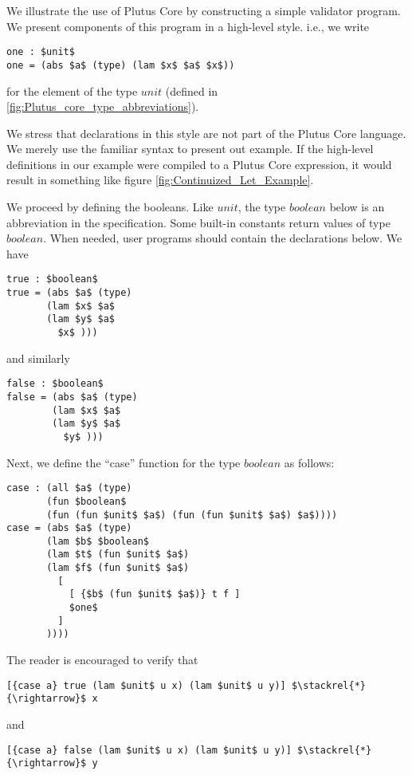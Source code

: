 \documentclass[../plutus-core-specification.tex]{subfiles}
\begin{document}
We illustrate the use of Plutus Core by constructing a simple validator program. We present components of this program in a high-level style. i.e., we write
\begin{lstlisting}[basicstyle=\ttfamily,mathescape]
one : $unit$
one = (abs $a$ (type) (lam $x$ $a$ $x$))
\end{lstlisting}
for the element of the type $unit$ (defined in \ref{fig:Plutus_core_type_abbreviations}).

We stress that declarations in this style are not part of the Plutus
Core language. We merely use the familiar syntax to present out
example. If the high-level definitions in our example were compiled to
a Plutus Core expression, it would result in something like figure
\ref{fig:Continuized_Let_Example}.

We proceed by defining the booleans. Like $unit$, the type $boolean$
below is an abbreviation in the specification. Some built-in constants
return values of type $boolean$. When needed, user programs should
contain the declarations below. We have
\begin{lstlisting}[basicstyle=\ttfamily,mathescape]
true : $boolean$
true = (abs $a$ (type)
       (lam $x$ $a$
       (lam $y$ $a$
         $x$ )))
\end{lstlisting}
and similarly
\begin{lstlisting}[basicstyle=\ttfamily,mathescape]
false : $boolean$
false = (abs $a$ (type)
        (lam $x$ $a$
        (lam $y$ $a$
          $y$ )))
\end{lstlisting}

Next, we define the ``case'' function for the type $boolean$ as follows:
\begin{lstlisting}[basicstyle=\ttfamily,mathescape]
case : (all $a$ (type)
       (fun $boolean$
       (fun (fun $unit$ $a$) (fun (fun $unit$ $a$) $a$))))
case = (abs $a$ (type)
       (lam $b$ $boolean$
       (lam $t$ (fun $unit$ $a$)
       (lam $f$ (fun $unit$ $a$)
         [
           [ {$b$ (fun $unit$ $a$)} t f ]
           $one$
         ]
       ))))
\end{lstlisting}
The reader is encouraged to verify that
\begin{lstlisting}[basicstyle=\ttfamily,mathescape]
[{case a} true (lam $unit$ u x) (lam $unit$ u y)] $\stackrel{*}{\rightarrow}$ x
\end{lstlisting}
and
\begin{lstlisting}[basicstyle=\ttfamily,mathescape]
[{case a} false (lam $unit$ u x) (lam $unit$ u y)] $\stackrel{*}{\rightarrow}$ y
\end{lstlisting}
\end{document}
